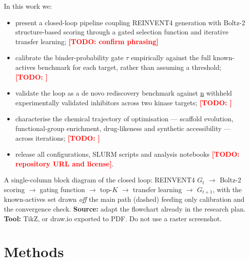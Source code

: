\documentclass[11pt]{article}
\newcommand{\TODO}[1]{\textcolor{red}{\textbf{[TODO: #1]}}}
\newcommand{\FILL}[1]{\textcolor{blue!65!black}{\underline{\textsf{#1}}}}
\newcommand{\Gmodel}{G}                         %
\newcommand{\Kk}{K}
\begin{document}
\noindent In this work we:
\begin{itemize}\itemsep2pt
  \item present a closed-loop pipeline coupling REINVENT4 generation with
        Boltz-2 structure-based scoring through a gated selection function and
        iterative transfer learning; \TODO{confirm phrasing}
  \item calibrate the binder-probability gate $\tau$ empirically against the
        full known-actives benchmark for each target, rather than assuming a
        threshold; \TODO{}
  \item validate the loop as a de novo rediscovery benchmark against
        \FILL{n} withheld experimentally validated inhibitors across two
        kinase targets; \TODO{}
  \item characterise the chemical trajectory of optimisation --- scaffold
        evolution, functional-group enrichment, drug-likeness and synthetic
        accessibility --- across iterations; \TODO{}
  \item release all configurations, SLURM scripts and analysis notebooks
        \TODO{repository URL and license}.
\end{itemize}

\begin{figrec}
A single-column block diagram of the closed loop:
REINVENT4 $\Gmodel_t$ $\rightarrow$ Boltz-2 scoring $\rightarrow$ gating
function $\rightarrow$ top-$\Kk$ $\rightarrow$ transfer learning $\rightarrow$
$\Gmodel_{t+1}$, with the known-actives set drawn \emph{off} the main path
(dashed) feeding only calibration and the convergence check.
\textbf{Source:} adapt the flowchart already in the research plan.
\textbf{Tool:} TikZ, or draw.io exported to PDF. Do not use a raster screenshot.
\end{figrec}


\section{Methods}
\label{sec:methods}
\end{document}
